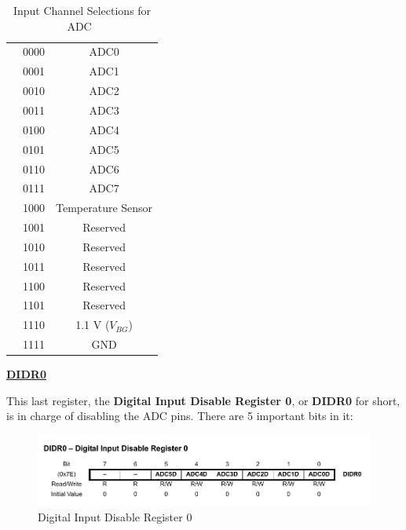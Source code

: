 \begin{itemize}
\begin{table}[H]
\begin{tabular}[t]{lcc}
            & 0000 & ADC0                            \\
            & 0001 & ADC1                            \\
            & 0010 & ADC2                            \\
            & 0011 & ADC3                            \\
            & 0100 & ADC4                            \\
            & 0101 & ADC5                            \\
            & 0110 & ADC6                            \\
            & 0111 & ADC7                            \\
            & 1000 & Temperature Sensor              \\
            & 1001 & Reserved                        \\
            & 1010 & Reserved                        \\
            & 1011 & Reserved                        \\
            & 1100 & Reserved                        \\
            & 1101 & Reserved                        \\
            & 1110 & 1.1 V ($V_{BG}$)                \\
            & 1111 & GND                             \\
            \bottomrule
        \end{tabular}
        \caption{Input Channel Selections for ADC~\autocite{ATMEGA328P}}
        \label{table:MUX30_SELECT}
    \end{table}

\end{itemize}


\medskip
\underline{\textbf{DIDR0}}\medskip
\medskip

This last register, the \textbf{Digital Input Disable Register 0}, or \textbf{DIDR0} for short, is in charge of disabling the ADC pins. There are 5 important bits in it:

\begin{figure}[H]
    \centering
    \includegraphics[width = \textwidth]{Graphics/MICROS/Practice 3/DATASHEET/DIDR0.pdf}
    \caption{Digital Input Disable Register 0~\autocite{ATMEGA328P}}
    \label{fig:DIDR0}
\end{figure}

